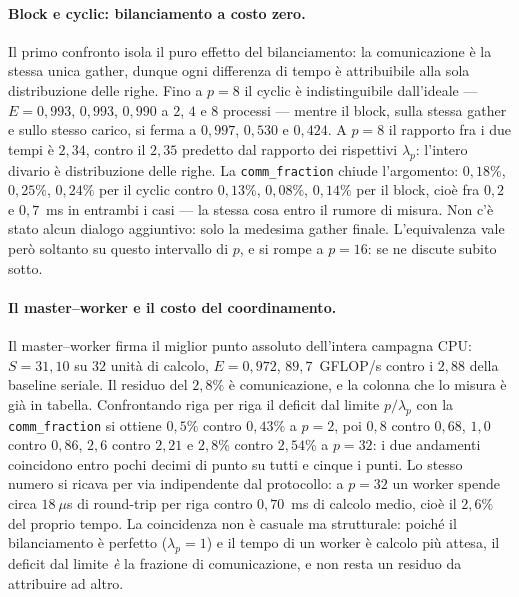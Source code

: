 \paragraph{Block e cyclic: bilanciamento a costo zero.}
Il primo confronto isola il puro effetto del bilanciamento: la comunicazione è
la stessa unica gather, dunque ogni differenza di tempo è attribuibile alla sola
distribuzione delle righe. Fino a $p=8$ il cyclic è indistinguibile dall'ideale
--- $E = 0{,}993$, $0{,}993$, $0{,}990$ a $2$, $4$ e $8$ processi --- mentre il
block, sulla stessa gather e sullo stesso carico, si ferma a $0{,}997$, $0{,}530$
e $0{,}424$. A $p=8$ il rapporto fra i due tempi è $2{,}34$, contro il $2{,}35$
predetto dal rapporto dei rispettivi $\lambda_p$: l'intero divario è
distribuzione delle righe. La \texttt{comm\_fraction} chiude l'argomento: $0{,}18\%$,
$0{,}25\%$, $0{,}24\%$ per il cyclic contro $0{,}13\%$, $0{,}08\%$, $0{,}14\%$
per il block, cioè fra $0{,}2$ e $0{,}7$~ms in entrambi i casi --- la stessa cosa
entro il rumore di misura. Non c'è stato alcun dialogo aggiuntivo: solo la
medesima gather finale. L'equivalenza vale però soltanto su questo intervallo di
$p$, e si rompe a $p=16$: se ne discute subito sotto.

\paragraph{Il master--worker e il costo del coordinamento.}
Il master--worker firma il miglior punto assoluto dell'intera campagna CPU:
$S = 31{,}10$ su $32$ unità di calcolo, $E = 0{,}972$, $89{,}7$~GFLOP/s contro i
$2{,}88$ della baseline seriale. Il residuo del $2{,}8\%$ è comunicazione, e la
colonna che lo misura è già in tabella. Confrontando riga per riga il deficit
dal limite $p/\lambda_p$ con la \texttt{comm\_fraction} si ottiene $0{,}5\%$
contro $0{,}43\%$ a $p=2$, poi $0{,}8$ contro $0{,}68$, $1{,}0$ contro $0{,}86$,
$2{,}6$ contro $2{,}21$ e $2{,}8\%$ contro $2{,}54\%$ a $p=32$: i due andamenti
coincidono entro pochi decimi di punto su tutti e cinque i punti. Lo stesso
numero si ricava per via indipendente dal protocollo: a $p=32$ un worker spende
circa $18~\mu$s di round-trip per riga contro $0{,}70$~ms di calcolo medio, cioè
il $2{,}6\%$ del proprio tempo. La coincidenza non è casuale ma strutturale:
poiché il bilanciamento è perfetto ($\lambda_p = 1$) e il tempo di un worker è
calcolo più attesa, il deficit dal limite \emph{è} la frazione di comunicazione,
e non resta un residuo da attribuire ad altro.

